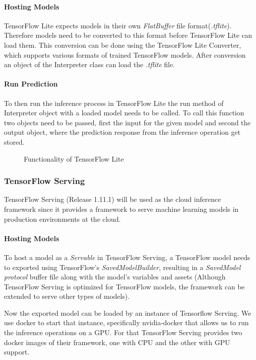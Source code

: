 \paragraph{Hosting Models}
TensorFlow Lite expects models in their own \emph{FlatBuffer} file  format(\emph{.tflite}). Therefore models need to be converted to this format before TensorFlow Lite can load them. This conversion can be done using the TensorFlow Lite Converter, which supports various formats of trained TensorFlow models.
After conversion an object of the Interpreter class can load the \emph{.tflite} file.
\paragraph{Run Prediction}

To then run the inference process in TensorFlow Lite the run method of Interpreter object with a loaded model needs to be called. To call this function two objects need to be passed, first the input for the given model and second the output object, where the prediction response from the inference operation get stored. 
\begin{figure}[!htb]
\centering

\caption{Functionality of TensorFlow Lite}
\label{fig:edge}
\end{figure}

\subsubsection{TensorFlow Serving}
\label{chap:TFServing}
TensorFlow Serving (Release 1.11.1) will be used as the cloud inference framework since it provides a framework to serve machine learning models in production environments at the cloud. 



\paragraph{Hosting Models}
To host a model as a \emph{Servable} in TensorFlow Serving, a TensorFlow model needs to exported using TensorFlow's \emph{SavedModelBuilder}, resulting in a \emph{SavedModel protocol} buffer file along with the model’s variables and assets (Although TensorFlow Serving is optimized for TensorFlow models, the framework can be extended to serve other types of models).

Now the exported model can be loaded by an instance of Tensorflow Serving.
We use docker to start that instance, specifically nvidia-docker that allows us to run the inference operations on a GPU. For that TensorFlow Serving provides two docker images of their framework, one with CPU and the other with GPU support.

